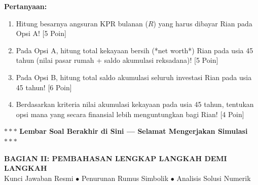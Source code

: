 \documentclass[11pt,a4paper]{article}
\begin{document}
\begin{naskahsoalbox}
\begin{itemize}[leftmargin=4mm, topsep=1pt, itemsep=1pt]
\end{itemize}
\textbf{Pertanyaan:}
\begin{enumerate}[label=(\alph*), topsep=2pt, itemsep=2pt]
    \item Hitung besarnya angsuran KPR bulanan ($R$) yang harus dibayar Rian pada Opsi A! \hfill [5 Poin]
    \item Pada Opsi A, hitung total kekayaan bersih (*net worth*) Rian pada usia 45 tahun (nilai pasar rumah + saldo akumulasi reksadana)! \hfill [5 Poin]
    \item Pada Opsi B, hitung total saldo akumulasi seluruh investasi Rian pada usia 45 tahun! \hfill [6 Poin]
    \item Berdasarkan kriteria nilai akumulasi kekayaan pada usia 45 tahun, tentukan opsi mana yang secara finansial lebih menguntungkan bagi Rian! \hfill [4 Poin]
\end{enumerate}
\end{naskahsoalbox}

\vfill
\begin{center}
    \small\color{gray}
    $\ast\ast\ast$ \textbf{Lembar Soal Berakhir di Sini --- Selamat Mengerjakan Simulasi} $\ast\ast\ast$
\end{center}

\newpage

\begin{center}
    {\fontsize{13}{16}\selectfont\bfseries\color{darkgreen} BAGIAN II: PEMBAHASAN LENGKAP LANGKAH DEMI LANGKAH}\\[1mm]
    {\fontsize{10}{12}\selectfont\color{darkgreen} Kunci Jawaban Resmi $\bullet$ Penurunan Rumus Simbolik $\bullet$ Analisis Solusi Numerik}
\end{center}
\vspace{2mm}
\end{document}
